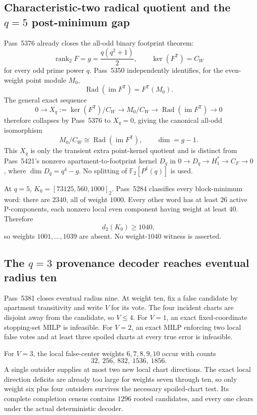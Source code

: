 \subsection{Characteristic-two radical quotient and the $q=5$ post-minimum gap}

Pass~5376 already closes the all-odd binary footprint theorem:
\[
 \operatorname{rank}_2F=g=\frac{q(q^2+1)}2,
 \qquad
 \ker(F^{\mathsf T})=C_W
\]
for every odd prime power $q$.  Pass~5350 independently identifies, for the
even-weight point module $M_0$,
\[
 \operatorname{Rad}(\operatorname{im}F^{\mathsf T})=F^{\mathsf T}(M_0).
\]
The general exact sequence
\[
 0\longrightarrow X_q:=\ker(F^{\mathsf T})/C_W
 \longrightarrow M_0/C_W
 \longrightarrow \operatorname{Rad}(\operatorname{im}F^{\mathsf T})
 \longrightarrow0
\]
therefore collapses by Pass~5376 to $X_q=0$, giving the canonical all-odd
isomorphism
\[
 \boxed{M_0/C_W\cong\operatorname{Rad}(\operatorname{im}F^{\mathsf T}),}
 \qquad \dim=g-1.
\]
This $X_q$ is only the transient extra point-kernel quotient and is distinct from
Pass~5421's nonzero apartment-to-footprint kernel $D_q$ in
$0\to D_q\to H_1^*\to C_F\to0$, where $\dim D_q=q^4-g$.  No splitting of
$\mathbb F_2[P^1(q)]$ is used.

At $q=5$, $K_0=[73125,560,1000]_2$.  Pass~5284 classifies every block-minimum
word: there are $2340$, all of weight $1000$.  Every other word has at least $26$
active P-components, each nonzero local even component having weight at least $40$.
Therefore
\[
 \boxed{d_2(K_0)\ge1040,}
\]
so weights $1001,\ldots,1039$ are absent.  No weight-$1040$ witness is asserted.

\subsection{The $q=3$ provenance decoder reaches eventual radius ten}

Pass~5381 closes eventual radius nine.  At weight ten, fix a false candidate by
apartment transitivity and write $V$ for its vote.  The four incident charts are
disjoint away from the candidate, so $V\le4$.  For $V=1$, an exact fixed-coordinate
stopping-set MILP is infeasible.  For $V=2$, an exact MILP enforcing two local
false votes and at least three spoiled charts at every true error is infeasible.

For $V=3$, the local false-center weights $6,7,8,9,10$ occur with counts
\[
 32,\ 256,\ 832,\ 1536,\ 1856.
\]
A single outsider supplies at most two new local chart directions.  The exact
local direction deficits are already too large for weights seven through ten, so
only weight six plus four outsiders survives the necessary spoiled-chart test.
Its complete completion census contains $\boxed{1296}$ rooted candidates, and
every one clears under the actual deterministic decoder.

